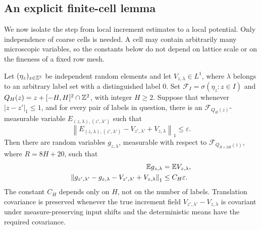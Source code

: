 \subsection{An explicit finite-cell lemma}

We now isolate the step from local increment estimates to a local
potential.  Only independence of coarse cells is needed.  A cell may
contain arbitrarily many microscopic variables, so the constants below
do not depend on lattice scale or on the fineness of a fixed row mesh.

\begin{lemma}
\label{found:lem-finite-cell}
Let $(\eta_z)_{z\in\mathbb Z^2}$ be independent random elements and let
$V_{z,\lambda}\in L^1$, where $\lambda$ belongs to an arbitrary label
set with a distinguished label $0$.  Set
$\mathcal F_I=\sigma(\eta_z:z\in I)$ and
$Q_H(z)=z+[-H,H]^2\cap\mathbb Z^2$, with integer $H\geq2$.
Suppose that whenever $|z-z'|_1\leq1$, and for every pair of labels
in question, there is an $\mathcal F_{Q_H(z)}$-measurable variable
$E_{(z,\lambda),(z',\lambda')}$ such that
\begin{equation}
 \left\|E_{(z,\lambda),(z',\lambda')}
       -V_{z',\lambda'}+V_{z,\lambda}\right\|_1
 \leq\varepsilon.                              \label{found:eq-abstract-hyp}
\end{equation}
Then there are random variables $g_{z,\lambda}$, measurable with respect
to $\mathcal F_{Q_{R+2H}(z)}$, where $R=8H+20$, such that
\begin{align}
 \mathbb E g_{z,\lambda}&=\mathbb E V_{z,\lambda},\label{found:eq-mean}\\
 \left\|g_{z',\lambda'}-g_{z,\lambda}
       -V_{z',\lambda'}+V_{z,\lambda}\right\|_1
 &\leq C_H\varepsilon.                         \label{found:eq-potential}
\end{align}
The constant $C_H$ depends only on $H$, not on the number of labels.
Translation covariance is preserved whenever the true increment field
$V_{z',\lambda'}-V_{z,\lambda}$ is covariant under measure-preserving input shifts
and the deterministic means have the required covariance.
\end{lemma}

